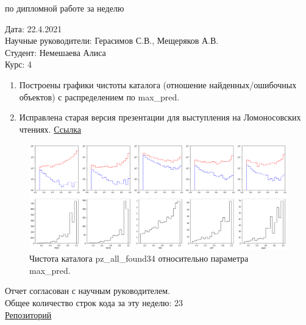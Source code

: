\documentclass{article}
\begin{document}
\begin{center}{ по дипломной работе за неделю\\}\end{center}
Дата: 22.4.2021\\
Научные руководители: Герасимов С.В., Мещеряков А.В.\\
Студент: Немешаева Алиса\\
Курс: 4\\

\renewcommand{\labelitemi}{$\blacksquare$}
\renewcommand\labelitemii{$\square$}

\begin{enumerate}
    \item Построены графики чистоты каталога (отношение найденных/ошибочных объектов) с 
        распределением по max\_pred.\\
    \item Исправлена старая версия презентации для выступления на Ломоносовских чтениях. 
        \href{https://github.com/rt2122/data-segmentation-2/blob/master/text/presentation_2021.4.22.pdf}{Ссылка}\\
\end{enumerate}

\begin{figure}[h]
    \includegraphics[width=\linewidth]{div}
\caption{Чистота каталога pz\_all\_found34 относительно параметра max\_pred.}
\label{Fig:div}
\end{figure}

Отчет согласован с научным руководителем.\\
Общее количество строк кода за эту неделю: 23\\
\href{https://github.com/rt2122/data-segmentation-2}{Репозиторий}\\ 
\end{document}
